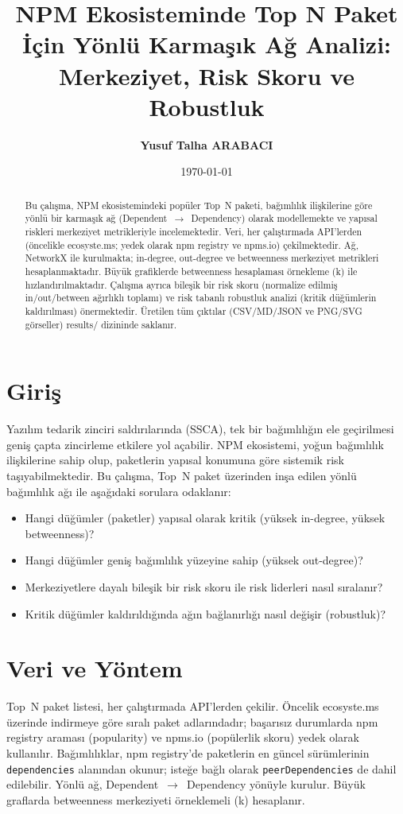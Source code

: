 \documentclass[11pt,a4paper]{article}
\title{NPM Ekosisteminde Top N Paket İçin Yönlü Karmaşık Ağ Analizi: Merkeziyet, Risk Skoru ve Robustluk}
\author{\textbf{Yusuf Talha ARABACI}}
\date{\today}
\begin{document}
\maketitle

\begin{abstract}
Bu çalışma, NPM ekosistemindeki popüler Top~N paketi, bağımlılık ilişkilerine göre yönlü bir karmaşık ağ (Dependent~$\to$~Dependency) olarak modellemekte ve yapısal riskleri merkeziyet metrikleriyle incelemektedir. Veri, her çalıştırmada API'lerden (öncelikle ecosyste.ms; yedek olarak npm registry ve npms.io) çekilmektedir. Ağ, NetworkX ile kurulmakta; in-degree, out-degree ve betweenness merkeziyet metrikleri hesaplanmaktadır. Büyük grafiklerde betweenness hesaplaması örnekleme (k) ile hızlandırılmaktadır. Çalışma ayrıca bileşik bir risk skoru (normalize edilmiş in/out/between ağırlıklı toplamı) ve risk tabanlı robustluk analizi (kritik düğümlerin kaldırılması) önermektedir. Üretilen tüm çıktılar (CSV/MD/JSON ve PNG/SVG görseller) results/ dizininde saklanır.
\end{abstract}

\section{Giriş}
Yazılım tedarik zinciri saldırılarında (SSCA), tek bir bağımlılığın ele geçirilmesi geniş çapta zincirleme etkilere yol açabilir. NPM ekosistemi, yoğun bağımlılık ilişkilerine sahip olup, paketlerin yapısal konumuna göre sistemik risk taşıyabilmektedir. Bu çalışma, Top~N paket üzerinden inşa edilen yönlü bağımlılık ağı ile aşağıdaki sorulara odaklanır:
\begin{itemize}
  \item Hangi düğümler (paketler) yapısal olarak kritik (yüksek in-degree, yüksek betweenness)?
  \item Hangi düğümler geniş bağımlılık yüzeyine sahip (yüksek out-degree)?
  \item Merkeziyetlere dayalı bileşik bir risk skoru ile risk liderleri nasıl sıralanır?
  \item Kritik düğümler kaldırıldığında ağın bağlanırlığı nasıl değişir (robustluk)?
\end{itemize}

\section{Veri ve Yöntem}
Top~N paket listesi, her çalıştırmada API'lerden çekilir. Öncelik ecosyste.ms üzerinde indirmeye göre sıralı paket adlarındadır; başarısız durumlarda npm registry araması (popularity) ve npms.io (popülerlik skoru) yedek olarak kullanılır. Bağımlılıklar, npm registry'de paketlerin en güncel sürümlerinin \texttt{dependencies} alanından okunur; isteğe bağlı olarak \texttt{peerDependencies} de dahil edilebilir. Yönlü ağ, Dependent~$\to$~Dependency yönüyle kurulur. Büyük graflarda betweenness merkeziyeti örneklemeli (k) hesaplanır.
\end{document}
